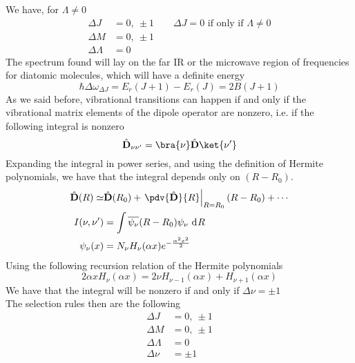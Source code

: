 \documentclass[a4paper, 11pt]{book}
\renewcommand{\vec}[1]{\mathbf{#1}}
\newcommand{\1}{\opr{\mathds{1}}}
\newcommand{\diff}[2][]{\ \mathrm{d}^{#1}#2}
\newcommand{\opr}[1]{\hat{#1}}
\newcommand{\cc}[1]{\overline{#1}}
\newcommand{\vecopr}[1]{\opr{\vec{#1}}}
\theoremstyle{plain}
\begin{document}
	We have, for $\Lambda\ne0$
	\begin{equation*}
		\begin{aligned}
			\Delta J&=0,\ \pm1\qquad\text{$\Delta J=0$ if only if $\Lambda\ne0$}\\
			\Delta M&=0,\ \pm1\\
			\Delta\Lambda&=0
		\end{aligned}
	\end{equation*}
	The spectrum found will lay on the far IR or the microwave region of frequencies for diatomic molecules, which will have a definite energy
	\begin{equation}
		\hbar\Delta\omega_{\Delta J}=E_r(J+1)-E_r(J)=2B(J+1)
		\label{eq:rotovibrationalspectrum}
	\end{equation}
	As we said before, vibrational transitions can happen if and only if the vibrational matrix elements of the dipole operator are nonzero, i.e. if the following integral is nonzero
	\begin{equation}
		\vecopr{D}_{\nu\nu'}=\bra{\nu}\vecopr{D}\ket{\nu'}
		\label{eq:electronictransitionmol}
	\end{equation}
	Expanding the integral in power series, and using the definition of Hermite polynomials, we have that the integral depends only on $(R-R_0)$.
	\begin{equation}
		\begin{aligned}
			\vecopr{D}(R)\simeq&\vecopr{D}(R_0)+\left.\pdv{\vecopr{D}}{R}\right|_{R=R_0}(R-R_0)+\cdots\\
			I(\nu,\nu')&=\int\cc{\psi_\nu}(R-R_0)\psi_\nu\diff{R}\\
			\psi_\nu(x)&=N_\nu H_\nu(\alpha x)e^{-\frac{\alpha^2x^2}{2}}
		\end{aligned}
		\label{eq:calculusintegralelectricdipole}
	\end{equation}
	Using the following recursion relation of the Hermite polynomials
	\begin{equation*}
		2\alpha xH_{\nu}(\alpha x)=2\nu H_{\nu-1}(\alpha x)+H_{\nu+1}(\alpha x)
	\end{equation*}
	We have that the integral will be nonzero if and only if $\Delta\nu=\pm1$\\
	The selection rules then are the following
	\begin{equation}
		\begin{aligned}
			\Delta J&=0,\ \pm1\\
			\Delta M&=0,\ \pm1\\
			\Delta\Lambda&=0\\
			\Delta\nu&=\pm1
		\end{aligned}
		\label{eq:selectionrulesmolecule}
	\end{equation}
\end{document}
